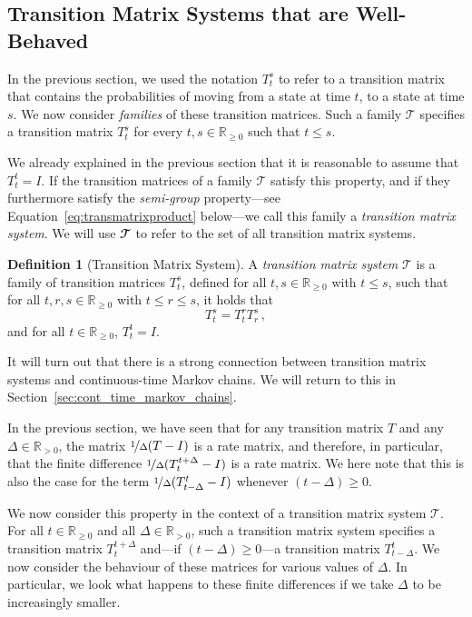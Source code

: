 \documentclass[10pt,a4paper]{paper}
\theoremstyle{definition}
\newtheorem{definition}{Definition}
\newcommand{\reals}{\mathbb{R}}
\newcommand{\realspos}{\reals_{>0}}
\newcommand{\realsnonneg}{\reals_{\geq 0}}
\begin{document}
\subsection{Transition Matrix Systems that are Well-Behaved}

In the previous section, we used the notation $T_t^s$ to refer to a transition matrix that contains the probabilities of moving from a state at time $t$, to a state at time $s$. We now consider \emph{families} of these transition matrices. Such a family $\mathcal{T}$ specifies a transition matrix $T_t^s$ for every $t,s\in\realsnonneg$ such that $t\leq s$. 

We already explained in the previous section that it is reasonable to assume that $T_t^t=I$. If the transition matrices of a family $\mathcal{T}$ satisfy this property, and if they furthermore satisfy the \emph{semi-group} property---see Equation~\ref{eq:transmatrixproduct} below---we call this family a \emph{transition matrix system}. We will use $\mathbfcal{T}$ to refer to the set of all transition matrix systems.

\begin{definition}[Transition Matrix System]\label{def:trans_mat_system}
A \emph{transition matrix system} $\mathcal{T}$ is a family of transition matrices $T_t^s$, defined for all $t,s\in\realsnonneg$ with $t\leq s$, such that for all $t,r,s\in\realsnonneg$ with $t\leq r\leq s$, it holds that
\begin{equation}\label{eq:transmatrixproduct}
T_t^s=T_t^r T_r^s\,,
\end{equation}
and for all $t\in\realsnonneg$, $T_t^t=I$.
\end{definition}
It will turn out that there is a strong connection between transition matrix systems and continuous-time Markov chains. We will return to this in Section~\ref{sec:cont_time_markov_chains}.

In the previous section, we have seen that for any transition matrix $T$ and any $\Delta\in\realspos$, the matrix $\nicefrac{1}{\Delta}(T - I)$ is a rate matrix, and therefore, in particular, that the finite difference $\nicefrac{1}{\Delta}(T_t^{t+\Delta} - I)$ is a rate matrix. We here note that this is also the case for the term $\nicefrac{1}{\Delta}(T_{t-\Delta}^t - I)$ whenever $(t-\Delta)\geq0$.

We now consider this property in the context of a transition matrix system $\mathcal{T}$. For all $t\in\realsnonneg$ and all $\Delta\in\realspos$, such a transition matrix system specifies a transition matrix $T_t^{t+\Delta}$ and---if $(t-\Delta)\geq0$---a transition matrix $T_{t-\Delta}^t$. We now consider the behaviour of these matrices for various values of $\Delta$. In particular, we look what happens to these finite differences if we take $\Delta$ to be increasingly smaller. 
\end{document}
